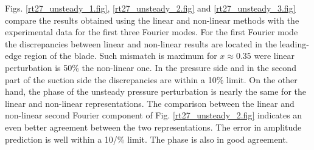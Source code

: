  Figs. \ref{rt27_unsteady_1.fig}, \ref{rt27_unsteady_2.fig} and
 \ref{rt27_unsteady_3.fig} compare the results obtained using
 the linear and non-linear methods with
 the experimental data for the first three Fourier modes.
 For the first Fourier mode the discrepancies between linear and non-linear results
 are located in the leading-edge region of the blade. Such mismatch is maximum
 for $x\approx 0.35$ were linear perturbation is 50\% the non-linear one.
 In the pressure side and in the second part of the suction side the discrepancies
 are within a 10\% limit. On the other hand, the phase of the unsteady pressure
 perturbation is nearly the same for the linear and non-linear
 representations.
 The comparison between the linear and non-linear second Fourier component
 of Fig. \ref{rt27_unsteady_2.fig} indicates an even better agreement
 between the two representations. The error in amplitude prediction is well
 within a 10/\% limit. The phase is also in good agreement.
%
